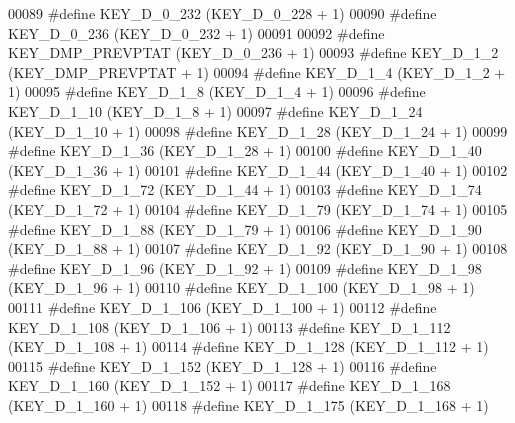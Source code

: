 \begin{DoxyCode}
00089 \textcolor{preprocessor}{#define KEY\_D\_0\_232                 (KEY\_D\_0\_228 + 1)}
00090 \textcolor{preprocessor}{#define KEY\_D\_0\_236                 (KEY\_D\_0\_232 + 1)}
00091 
00092 \textcolor{preprocessor}{#define KEY\_DMP\_PREVPTAT            (KEY\_D\_0\_236 + 1)}
00093 \textcolor{preprocessor}{#define KEY\_D\_1\_2                   (KEY\_DMP\_PREVPTAT + 1)}
00094 \textcolor{preprocessor}{#define KEY\_D\_1\_4                   (KEY\_D\_1\_2 + 1)}
00095 \textcolor{preprocessor}{#define KEY\_D\_1\_8                   (KEY\_D\_1\_4 + 1)}
00096 \textcolor{preprocessor}{#define KEY\_D\_1\_10                  (KEY\_D\_1\_8 + 1)}
00097 \textcolor{preprocessor}{#define KEY\_D\_1\_24                  (KEY\_D\_1\_10 + 1)}
00098 \textcolor{preprocessor}{#define KEY\_D\_1\_28                  (KEY\_D\_1\_24 + 1)}
00099 \textcolor{preprocessor}{#define KEY\_D\_1\_36                  (KEY\_D\_1\_28 + 1)}
00100 \textcolor{preprocessor}{#define KEY\_D\_1\_40                  (KEY\_D\_1\_36 + 1)}
00101 \textcolor{preprocessor}{#define KEY\_D\_1\_44                  (KEY\_D\_1\_40 + 1)}
00102 \textcolor{preprocessor}{#define KEY\_D\_1\_72                  (KEY\_D\_1\_44 + 1)}
00103 \textcolor{preprocessor}{#define KEY\_D\_1\_74                  (KEY\_D\_1\_72 + 1)}
00104 \textcolor{preprocessor}{#define KEY\_D\_1\_79                  (KEY\_D\_1\_74 + 1)}
00105 \textcolor{preprocessor}{#define KEY\_D\_1\_88                  (KEY\_D\_1\_79 + 1)}
00106 \textcolor{preprocessor}{#define KEY\_D\_1\_90                  (KEY\_D\_1\_88 + 1)}
00107 \textcolor{preprocessor}{#define KEY\_D\_1\_92                  (KEY\_D\_1\_90 + 1)}
00108 \textcolor{preprocessor}{#define KEY\_D\_1\_96                  (KEY\_D\_1\_92 + 1)}
00109 \textcolor{preprocessor}{#define KEY\_D\_1\_98                  (KEY\_D\_1\_96 + 1)}
00110 \textcolor{preprocessor}{#define KEY\_D\_1\_100                 (KEY\_D\_1\_98 + 1)}
00111 \textcolor{preprocessor}{#define KEY\_D\_1\_106                 (KEY\_D\_1\_100 + 1)}
00112 \textcolor{preprocessor}{#define KEY\_D\_1\_108                 (KEY\_D\_1\_106 + 1)}
00113 \textcolor{preprocessor}{#define KEY\_D\_1\_112                 (KEY\_D\_1\_108 + 1)}
00114 \textcolor{preprocessor}{#define KEY\_D\_1\_128                 (KEY\_D\_1\_112 + 1)}
00115 \textcolor{preprocessor}{#define KEY\_D\_1\_152                 (KEY\_D\_1\_128 + 1)}
00116 \textcolor{preprocessor}{#define KEY\_D\_1\_160                 (KEY\_D\_1\_152 + 1)}
00117 \textcolor{preprocessor}{#define KEY\_D\_1\_168                 (KEY\_D\_1\_160 + 1)}
00118 \textcolor{preprocessor}{#define KEY\_D\_1\_175                 (KEY\_D\_1\_168 + 1)}

\end{DoxyCode}
